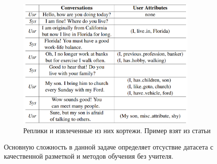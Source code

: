 \begin{figure}[!ht]
    \centering
    \includegraphics[width=0.8\textwidth]{images/gtky_task.png}
    \caption{Реплики и извлеченные из них кортежи. Пример взят из статьи \cite{gtky}}
    \label{fig:gtky_task}
\end{figure}

 Основную сложность в данной задаче определяет отсуствие датасета с качественной разметкой и методов обучения без учителя.
 